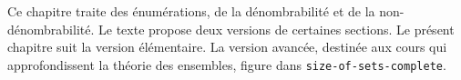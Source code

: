 \documentclass[../../../include/open-logic-chapter]{subfiles}
\begin{document}

\begin{editorial}
Ce chapitre traite des énumérations, de la dénombrabilité et de la
non-dénombrabilité. Le texte propose deux versions de certaines
sections. Le présent chapitre suit la version élémentaire.
La version avancée, destinée aux cours qui approfondissent la
théorie des ensembles, figure dans
\verb|size-of-sets-complete|.
%
\end{editorial}











\OLEndChapterHook
\end{document}
